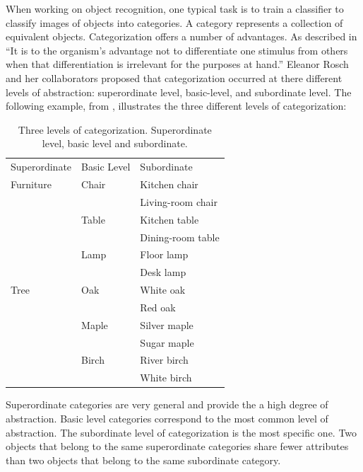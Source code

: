 When working on object recognition, one typical task is to train a classifier to classify images of objects into categories. A category represents a collection of equivalent objects.  Categorization offers a number of advantages. As described in \cite{Rosch1976BasicOI} ``It is to the organism’s advantage not to differentiate one stimulus from others when that differentiation is irrelevant for the purposes at hand.'' Eleanor Rosch and her collaborators proposed that categorization occurred at there different levels of abstraction: superordinate level, basic-level, and subordinate level. 
The following example, from \cite{Rosch1978}, illustrates the three different levels of categorization:
\begin{table}[h]
\caption{Three levels of categorization. Superordinate level, basic level and subordinate.} 
\label{table:levels_of_categorization}
\begin{center}
\begin{tabular}{l|l|l}
Superordinate & Basic Level & Subordinate\\
\cline{1-3}
Furniture & Chair & Kitchen chair\\
 &  & Living-room chair\\
 & Table & Kitchen table\\
 & & Dining-room table\\
 & Lamp & Floor lamp\\
 & & Desk lamp\\
Tree & Oak & White oak\\
 & & Red oak\\
 & Maple & Silver maple\\
 & & Sugar maple\\
 & Birch & River birch\\
 & & White birch\\
\end{tabular}
\end{center}
\end{table}


Superordinate categories are very general and provide the a high degree of abstraction. Basic level categories correspond to the most common level of abstraction. The subordinate level of categorization is the most specific one. Two objects that belong to the same superordinate categories share fewer attributes than two objects that belong to the same subordinate category. 


